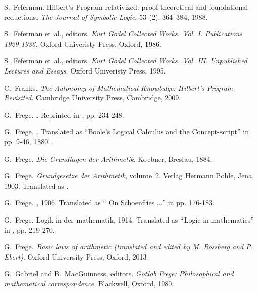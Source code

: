 \documentclass[11pt,fleqn,leqno]{article}
\begin{document}
\begin{thebibliography}{118}
S.~Feferman.
\newblock Hilbert's {P}rogram relativized: proof-theoretical and foundational
  reductions.
\newblock \emph{The Journal of Symbolic Logic}, 53 (2):
  364--384, 1988.

S.~Feferman et~al., editors.
\newblock \emph{{Kurt G\"odel Collected Works. Vol. I. Publications
  1929-1936}}.
\newblock Oxford Univeristy Press, Oxford, 1986.

S.~Feferman et~al., editors.
\newblock \emph{{Kurt G\"odel Collected Works. {V}ol. {III}. Unpublished
  Lectures and Essays}}.
\newblock Oxford Univeristy Press, 1995.

C.~Franks.
\newblock \emph{The Autonomy of Mathematical Knowledge: {H}ilbert's Program
  Revisited}.
\newblock Cambridge University Press, Cambridge, 2009.

G.~Frege.
.
\newblock Reprinted in \citep{Frege1984}, pp. 234-248.

G.~Frege.
.
\newblock Translated as ``Boole's Logical Calculus and the Concept-script'' in
  \cite{Frege1979} pp. 9-46, 1880.

G.~Frege.
\newblock \emph{Die {G}rundlagen der {A}rithmetik}.
\newblock Koebner, Breslau, 1884.

G.~Frege.
\newblock \emph{{Grundgesetze der Arithmetik}}, volume~2.
\newblock Verlag Hermann Pohle, Jena, 1903.
\newblock Translated as \citep{Frege2013}.

G.~Frege.
, 1906.
\newblock Translated as `` On Schoenflies $\ldots$'' in \citep{Frege1979} pp.
  176-183.

G.~Frege.
\newblock Logik in der mathematik, 1914.
\newblock Translated as ``Logic in mathematics'' in \citep{Frege1979}, pp.
  219-270.

G.~Frege.
\newblock \emph{Basic laws of arithmetic (translated and edited by M. Rossberg
  and P. Ebert)}.
\newblock Oxford University Press, Oxford, 2013.

G.~Gabriel and B.~MacGuinness, editors.
\newblock \emph{{Gotlob Frege: Philosophical and mathematical correspondence}}.
\newblock Blackwell, Oxford, 1980.


\end{thebibliography}
\end{document}
